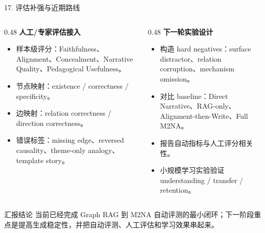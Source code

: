 \documentclass[aspectratio=169,UTF8]{ctexbeamer}
\begin{document}
\begin{frame}{17. 评估补强与近期路线}
  \footnotesize
  \begin{columns}[T,onlytextwidth]
    \begin{column}{0.48\textwidth}
      \textbf{人工/专家评估接入}
      \begin{itemize}
        \item 样本级评分：Faithfulness、Alignment、Concealment、Narrative Quality、Pedagogical Usefulness。
        \item 节点映射：existence / correctness / specificity。
        \item 边映射：relation correctness / direction correctness。
        \item 错误标签：missing edge、reversed causality、theme-only analogy、template story。
      \end{itemize}
    \end{column}
    \begin{column}{0.48\textwidth}
      \textbf{下一轮实验设计}
      \begin{itemize}
        \item 构造 hard negatives：surface distractor、relation corruption、mechanism omission。
        \item 对比 baseline：Direct Narrative、RAG-only、Alignment-then-Write、Full M2NA。
        \item 报告自动指标与人工评分相关性。
        \item 小规模学习实验验证 understanding / transfer / retention。
      \end{itemize}
    \end{column}
  \end{columns}

  \vspace{0.25em}
  \begin{block}{汇报结论}
    当前已经完成 Graph RAG 到 M2NA 自动评测的最小闭环；下一阶段重点是提高生成稳定性，并把自动评测、人工评估和学习效果串起来。
  \end{block}
\end{frame}
\end{document}
